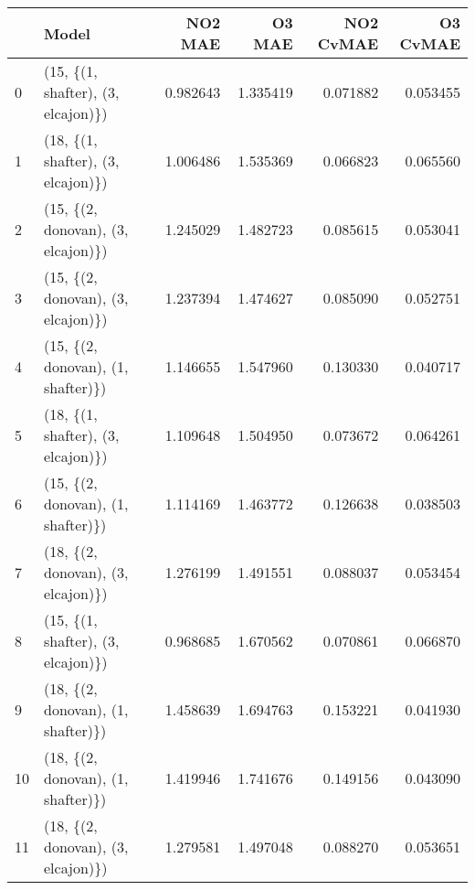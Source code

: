 \begin{tabular}{llrrrr}
\toprule
{} &                               Model &   NO2 MAE &    O3 MAE &  NO2 CvMAE &  O3 CvMAE \\
\midrule
0  &  (15, \{(1, shafter), (3, elcajon)\}) &  0.982643 &  1.335419 &   0.071882 &  0.053455 \\
1  &  (18, \{(1, shafter), (3, elcajon)\}) &  1.006486 &  1.535369 &   0.066823 &  0.065560 \\
2  &  (15, \{(2, donovan), (3, elcajon)\}) &  1.245029 &  1.482723 &   0.085615 &  0.053041 \\
3  &  (15, \{(2, donovan), (3, elcajon)\}) &  1.237394 &  1.474627 &   0.085090 &  0.052751 \\
4  &  (15, \{(2, donovan), (1, shafter)\}) &  1.146655 &  1.547960 &   0.130330 &  0.040717 \\
5  &  (18, \{(1, shafter), (3, elcajon)\}) &  1.109648 &  1.504950 &   0.073672 &  0.064261 \\
6  &  (15, \{(2, donovan), (1, shafter)\}) &  1.114169 &  1.463772 &   0.126638 &  0.038503 \\
7  &  (18, \{(2, donovan), (3, elcajon)\}) &  1.276199 &  1.491551 &   0.088037 &  0.053454 \\
8  &  (15, \{(1, shafter), (3, elcajon)\}) &  0.968685 &  1.670562 &   0.070861 &  0.066870 \\
9  &  (18, \{(2, donovan), (1, shafter)\}) &  1.458639 &  1.694763 &   0.153221 &  0.041930 \\
10 &  (18, \{(2, donovan), (1, shafter)\}) &  1.419946 &  1.741676 &   0.149156 &  0.043090 \\
11 &  (18, \{(2, donovan), (3, elcajon)\}) &  1.279581 &  1.497048 &   0.088270 &  0.053651 \\
\bottomrule
\end{tabular}
